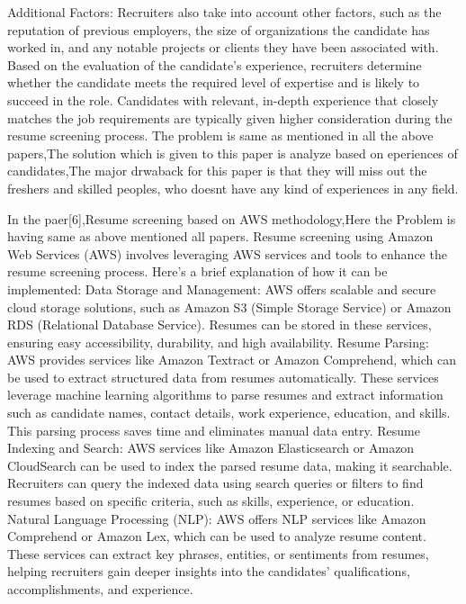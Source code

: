 \documentclass[12 pt, oneside]{book}
\begin{document}
\newline
Additional Factors: Recruiters also take into account other factors, such as the reputation of previous employers, the size of organizations the candidate has worked in, and any notable projects or clients they have been associated with.
\newline
Based on the evaluation of the candidate's experience, recruiters determine whether the candidate meets the required level of expertise and is likely to succeed in the role. Candidates with relevant, in-depth experience that closely matches the job requirements are typically given higher consideration during the resume screening process.
The problem is same as mentioned in all the above papers,The solution which is given to this paper is analyze based on eperiences of candidates,The major drwaback for this paper is that they will miss out the freshers and skilled peoples, who doesnt have any kind of experiences in any field.
\bigskip
\par In the paer[6],Resume screening based on AWS methodology,Here the Problem is having same as above mentioned all papers.
Resume screening using Amazon Web Services (AWS) involves leveraging AWS services and tools to enhance the resume screening process. Here's a brief explanation of how it can be implemented:
\newline
Data Storage and Management: AWS offers scalable and secure cloud storage solutions, such as Amazon S3 (Simple Storage Service) or Amazon RDS (Relational Database Service). Resumes can be stored in these services, ensuring easy accessibility, durability, and high availability.
\newline
Resume Parsing: AWS provides services like Amazon Textract or Amazon Comprehend, which can be used to extract structured data from resumes automatically. These services leverage machine learning algorithms to parse resumes and extract information such as candidate names, contact details, work experience, education, and skills. This parsing process saves time and eliminates manual data entry.
\newline
Resume Indexing and Search: AWS services like Amazon Elasticsearch or Amazon CloudSearch can be used to index the parsed resume data, making it searchable. Recruiters can query the indexed data using search queries or filters to find resumes based on specific criteria, such as skills, experience, or education.
\newline
Natural Language Processing (NLP): AWS offers NLP services like Amazon Comprehend or Amazon Lex, which can be used to analyze resume content. These services can extract key phrases, entities, or sentiments from resumes, helping recruiters gain deeper insights into the candidates' qualifications, accomplishments, and experience.
\end{document}

